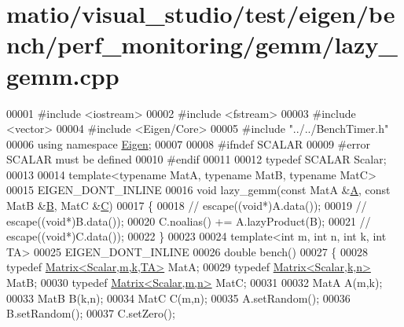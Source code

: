 \hypertarget{matio_2visual__studio_2test_2eigen_2bench_2perf__monitoring_2gemm_2lazy__gemm_8cpp_source}{}\section{matio/visual\+\_\+studio/test/eigen/bench/perf\+\_\+monitoring/gemm/lazy\+\_\+gemm.cpp}
\label{matio_2visual__studio_2test_2eigen_2bench_2perf__monitoring_2gemm_2lazy__gemm_8cpp_source}

\begin{DoxyCode}
00001 \textcolor{preprocessor}{#include <iostream>}
00002 \textcolor{preprocessor}{#include <fstream>}
00003 \textcolor{preprocessor}{#include <vector>}
00004 \textcolor{preprocessor}{#include <Eigen/Core>}
00005 \textcolor{preprocessor}{#include "../../BenchTimer.h"}
00006 \textcolor{keyword}{using namespace }\hyperlink{namespace_eigen}{Eigen};
00007 
00008 \textcolor{preprocessor}{#ifndef SCALAR}
00009 \textcolor{preprocessor}{#error SCALAR must be defined}
00010 \textcolor{preprocessor}{#endif}
00011 
00012 \textcolor{keyword}{typedef} SCALAR Scalar;
00013 
00014 \textcolor{keyword}{template}<\textcolor{keyword}{typename} MatA, \textcolor{keyword}{typename} MatB, \textcolor{keyword}{typename} MatC>
00015 EIGEN\_DONT\_INLINE
00016 \textcolor{keywordtype}{void} lazy\_gemm(\textcolor{keyword}{const} MatA &\hyperlink{group___core___module_class_eigen_1_1_matrix}{A}, \textcolor{keyword}{const} MatB &\hyperlink{group___core___module_class_eigen_1_1_matrix}{B}, MatC &\hyperlink{group___core___module}{C})
00017 \{
00018 \textcolor{comment}{//   escape((void*)A.data());}
00019 \textcolor{comment}{//   escape((void*)B.data());}
00020   C.noalias() += A.lazyProduct(B);
00021 \textcolor{comment}{//   escape((void*)C.data());}
00022 \}
00023 
00024 \textcolor{keyword}{template}<\textcolor{keywordtype}{int} m, \textcolor{keywordtype}{int} n, \textcolor{keywordtype}{int} k, \textcolor{keywordtype}{int} TA>
00025 EIGEN\_DONT\_INLINE
00026 \textcolor{keywordtype}{double} bench()
00027 \{
00028   \textcolor{keyword}{typedef} \hyperlink{group___core___module_class_eigen_1_1_matrix}{Matrix<Scalar,m,k,TA>} MatA;
00029   \textcolor{keyword}{typedef} \hyperlink{group___core___module_class_eigen_1_1_matrix}{Matrix<Scalar,k,n>} MatB;
00030   \textcolor{keyword}{typedef} \hyperlink{group___core___module_class_eigen_1_1_matrix}{Matrix<Scalar,m,n>} MatC;
00031 
00032   MatA A(m,k);
00033   MatB B(k,n);
00034   MatC C(m,n);
00035   A.setRandom();
00036   B.setRandom();
00037   C.setZero();

\end{DoxyCode}
